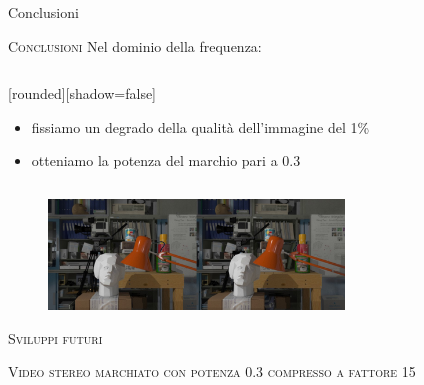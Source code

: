 \documentclass{beamer}
\begin{document}
\begin{section}{Conclusioni}
\begin{frame}[t]{\textsc{Conclusioni}}
Nel dominio della frequenza:
\begin{columns}
\begin{column}{5cm}
[rounded][shadow=false]
\begin{block}{}
\begin{itemize}
\item fissiamo un degrado della qualit\`{a} dell'immagine del 1\%
\item otteniamo la potenza del marchio pari a 0.3 
\end{itemize}
\end{block}

\end{column}
\begin{column}{5cm}
\vspace{-10mm}
\begin{table}
\end{table}

\end{column}
\end{columns}
\vspace{2mm}
\begin{figure}
  \includegraphics[width=0.7\textwidth]{./img_wat/marked_03_DFT.jpg}  
  \caption{} 
  \label{fig:mg1}
\end{figure}
\end{frame}

\begin{frame}[t]{\textsc{Sviluppi futuri}}


\end{frame}


\begin{frame}[t]{\textsc{Video stereo marchiato con potenza 0.3 compresso a fattore 15
}}
\vspace{2mm}
\begin{center}
\end{center}

\end{frame}
\end{section}
\end{document}
